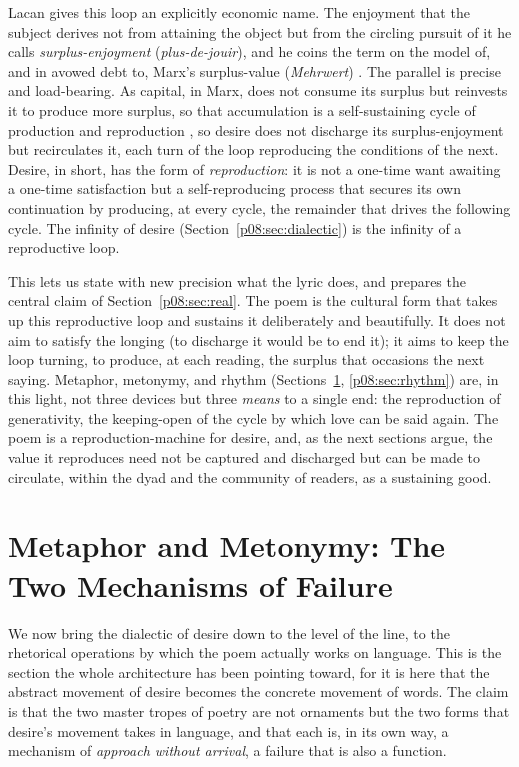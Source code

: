 Lacan gives this loop an explicitly economic name. The enjoyment that the subject derives not from attaining the object but from the circling pursuit of it he calls \emph{surplus-enjoyment} (\textit{plus-de-jouir}), and he coins the term on the model of, and in avowed debt to, Marx's surplus-value (\textit{Mehrwert}) \parencite{lacan2007seminarxvii}. The parallel is precise and load-bearing. As capital, in Marx, does not consume its surplus but reinvests it to produce more surplus, so that accumulation is a self-sustaining cycle of production and reproduction \parencite{marx1867capital}, so desire does not discharge its surplus-enjoyment but recirculates it, each turn of the loop reproducing the conditions of the next. Desire, in short, has the form of \emph{reproduction}: it is not a one-time want awaiting a one-time satisfaction but a self-reproducing process that secures its own continuation by producing, at every cycle, the remainder that drives the following cycle. The infinity of desire (Section~\ref{p08:sec:dialectic}) is the infinity of a reproductive loop.

This lets us state with new precision what the lyric does, and prepares the central claim of Section~\ref{p08:sec:real}. The poem is the cultural form that takes up this reproductive loop and sustains it deliberately and beautifully. It does not aim to satisfy the longing (to discharge it would be to end it); it aims to keep the loop turning, to produce, at each reading, the surplus that occasions the next saying. Metaphor, metonymy, and rhythm (Sections~\ref{p08:sec:rhetoric}, \ref{p08:sec:rhythm}) are, in this light, not three devices but three \emph{means} to a single end: the reproduction of generativity, the keeping-open of the cycle by which love can be said again. The poem is a reproduction-machine for desire, and, as the next sections argue, the value it reproduces need not be captured and discharged but can be made to circulate, within the dyad and the community of readers, as a sustaining good.

\section{Metaphor and Metonymy: The Two Mechanisms of Failure}\label{p08:sec:rhetoric}

We now bring the dialectic of desire down to the level of the line, to the rhetorical operations by which the poem actually works on language. This is the section the whole architecture has been pointing toward, for it is here that the abstract movement of desire becomes the concrete movement of words. The claim is that the two master tropes of poetry are not ornaments but the two forms that desire's movement takes in language, and that each is, in its own way, a mechanism of \emph{approach without arrival}, a failure that is also a function.

